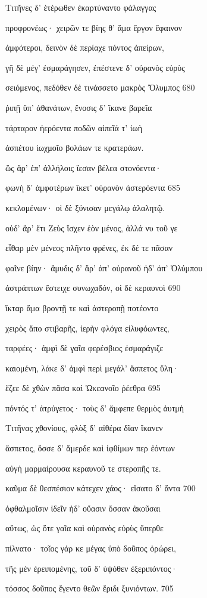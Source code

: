 Τιτῆνες δ' ἑτέρωθεν ἐκαρτύναντο φάλαγγας

προφρονέως· χειρῶν τε βίης θ' ἅμα ἔργον ἔφαινον 

ἀμφότεροι, δεινὸν δὲ περίαχε πόντος ἀπείρων,

γῆ δὲ μέγ' ἐσμαράγησεν, ἐπέστενε δ' οὐρανὸς εὐρὺς

σειόμενος, πεδόθεν δὲ τινάσσετο μακρὸς Ὄλυμπος 680

ῥιπῇ ὕπ' ἀθανάτων, ἔνοσις δ' ἵκανε βαρεῖα

τάρταρον ἠερόεντα ποδῶν αἰπεῖά τ' ἰωὴ

ἀσπέτου ἰωχμοῖο βολάων τε κρατεράων. 

ὣς ἄρ' ἐπ' ἀλλήλοις ἵεσαν βέλεα στονόεντα· 

φωνὴ δ' ἀμφοτέρων ἵκετ' οὐρανὸν ἀστερόεντα 685

κεκλομένων· οἱ δὲ ξύνισαν μεγάλῳ ἀλαλητῷ. 

οὐδ' ἄρ' ἔτι Ζεὺς ἴσχεν ἑὸν μένος, ἀλλά νυ τοῦ γε

εἶθαρ μὲν μένεος πλῆντο φρένες, ἐκ δέ τε πᾶσαν

φαῖνε βίην· ἄμυδις δ' ἄρ' ἀπ' οὐρανοῦ ἠδ' ἀπ' Ὀλύμπου 

ἀστράπτων ἔστειχε συνωχαδόν, οἱ δὲ κεραυνοὶ 690 

ἴκταρ ἅμα βροντῇ τε καὶ ἀστεροπῇ ποτέοντο

χειρὸς ἄπο στιβαρῆς, ἱερὴν φλόγα εἰλυφόωντες, 

ταρφέες· ἀμφὶ δὲ γαῖα φερέσβιος ἐσμαράγιζε 

καιομένη, λάκε δ' ἀμφὶ περὶ μεγάλ' ἄσπετος ὕλη·

ἔζεε δὲ χθὼν πᾶσα καὶ Ὠκεανοῖο ῥέεθρα 695

πόντός τ' ἀτρύγετος· τοὺς δ' ἄμφεπε θερμὸς ἀυτμὴ 

Τιτῆνας χθονίους, φλὸξ δ' αἰθέρα δῖαν ἵκανεν

ἄσπετος, ὄσσε δ' ἄμερδε καὶ ἰφθίμων περ ἐόντων

αὐγὴ μαρμαίρουσα κεραυνοῦ τε στεροπῆς τε.

καῦμα δὲ θεσπέσιον κάτεχεν χάος· εἴσατο δ' ἄντα 700 

ὀφθαλμοῖσιν ἰδεῖν ἠδ' οὔασιν ὄσσαν ἀκοῦσαι

αὔτως, ὡς ὅτε γαῖα καὶ οὐρανὸς εὐρὺς ὕπερθε 

πίλνατο· τοῖος γάρ κε μέγας ὑπὸ δοῦπος ὀρώρει, 

τῆς μὲν ἐρειπομένης, τοῦ δ' ὑψόθεν ἐξεριπόντος· 

τόσσος δοῦπος ἔγεντο θεῶν ἔριδι ξυνιόντων. 705

